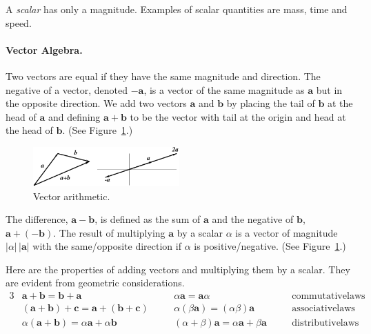 A \textit{scalar} has only a magnitude.  Examples of scalar quantities are
mass, time and speed.




\paragraph{Vector Algebra.}
Two vectors are equal if they have the same magnitude and direction.  
The negative of a vector, denoted $- \mathbf{a}$, is a vector of the same
magnitude as $\mathbf{a}$ but in the opposite direction.  We add two vectors
$\mathbf{a}$ and $\mathbf{b}$ by placing the tail of $\mathbf{b}$ at 
the head of $\mathbf{a}$ and defining $\mathbf{a} + \mathbf{b}$ to be 
the vector with tail at the origin and head at the head of $\mathbf{b}$.
(See Figure~\ref{addvector}.)

\begin{figure}[htb!]
\begin{center}
  \includegraphics[width=0.5\textwidth]{algebra/vectors/addvec}
\end{center}
\caption{Vector arithmetic.}
\label{addvector}
\end{figure}

The difference, $\mathbf{a} - \mathbf{b}$, is defined as the sum of 
$\mathbf{a}$ and the negative of $\mathbf{b}$, $\mathbf{a} + (- \mathbf{b})$.
The result of multiplying $\mathbf{a}$ by a scalar $\alpha$ is a vector of 
magnitude $|\alpha|\,| \mathbf{a} |$ with the same/opposite direction if 
$\alpha$ is positive/negative.  (See Figure~\ref{addvector}.) 

Here are the properties of adding vectors and multiplying them by a 
scalar.  They are evident from geometric considerations.
\begin{alignat*}{3}
&\mathbf{a} + \mathbf{b} = \mathbf{b} + \mathbf{a} &\quad
&\alpha \mathbf{a} = \mathbf{a} \alpha &\quad
&\mathrm{commutative laws} \\
&( \mathbf{a} + \mathbf{b} ) + \mathbf{c} 
        = \mathbf{a} + ( \mathbf{b} + \mathbf{c} ) &\quad
&\alpha ( \beta \mathbf{a} ) = ( \alpha \beta ) \mathbf{a} &\quad
&\mathrm{associative laws} \\
&\alpha ( \mathbf{a} + \mathbf{b} ) 
        = \alpha \mathbf{a} + \alpha \mathbf{b} &\quad
&( \alpha + \beta ) \mathbf{a} = \alpha \mathbf{a} + \beta \mathbf{a} &\quad
&\mathrm{distributive laws}
\end{alignat*}




